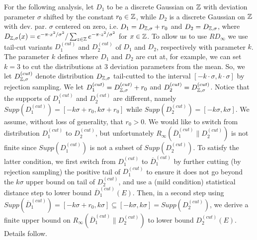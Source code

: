 For the following analysis, let $D_1$ to be a discrete Gaussian on $\mathbb{Z}$ with
deviation parameter $\sigma$ shifted by the constant $r_0 \in \mathbb{Z}$, while $D_2$
is a discrete Gaussian on $\mathbb{Z}$ with dev. par. $\sigma$ centered on zero,
i.e. $D_1 = D_{\mathbb{Z},\sigma} + r_0$ and $D_2 = D_{\mathbb{Z},\sigma}$, where
$D_{\mathbb{Z},\sigma}(x) = e^{-\pi \cdot x^2/\sigma^2}/\sum_{z \in \mathbb{Z}} e^{-\pi \cdot
  z^2/\sigma^2}$ for $x \in \mathbb{Z}$. To allow us to use $RD_{\infty}$ we use
tail-cut variants $D_1^{(cut)}$ and $D_2^{(cut)}$ of $D_1$ and $D_2$,
respectively with parameter $k$. The parameter $k$ defines where $D_1$ and $D_2$
are cut at, for example, we can set $k=3$ to cut the distributions at 3
deviation parameters from the mean. So, we let $D_{\mathbb{Z},\sigma}^{(cut)}$ denote
distribution $D_{\mathbb{Z},\sigma}$ tail-cutted to the interval
$[-k \cdot \sigma, k \cdot \sigma]$ by rejection sampling. We let
$D_1^{(cut)} = D_{\mathbb{Z},\sigma}^{(cut)} + r_0$ and
$D_2^{(cut)} = D_{\mathbb{Z},\sigma}^{(cut)}$. Notice that the supports of
$D_1^{(cut)}$ and $D_2^{(cut)}$ are different, namely
$Supp(D_1^{(cut)}) = [-k\sigma+r_0,k\sigma+r_0]$ while
$Supp(D_2^{(cut)}) = [-k\sigma,k\sigma]$. We assume, without loss of generality,
that $r_0 > 0$. We would like to switch from distribution $D_1^{(cut)}$ to
$D_2^{(cut)}$, but unfortunately $R_\infty(\overline{D}_1^{(cut)}\|D_2^{(cut)})$
is not finite since $Supp(D_1^{(cut)})$ is not a subset of
$Supp(D_2^{(cut)})$. To satisfy the latter condition, we first switch from
$D_1^{(cut)}$ to $\overline{D}_1^{(cut)}$ by further cutting (by rejection
sampling) the positive tail of $D_1^{(cut)}$ to ensure it does not go beyond the
$k \sigma$ upper bound on tail of $D_2^{(cut)}$, and use a (mild condition)
statistical distance step to lower bound $\overline{D}_1^{(cut)}(E)$. Then, in a
second step using
$Supp(\overline{D}_1^{(cut)})=[-k\sigma+r_0, k\sigma] \subseteq
[-k\sigma,k\sigma] = Supp(D_2^{(cut)})$, we derive a finite upper bound on
$R_\infty(\overline{D}_1^{(cut)}\|D_2^{(cut)})$ to lower bound
$D_2^{(cut)}(E)$. Details follow.
